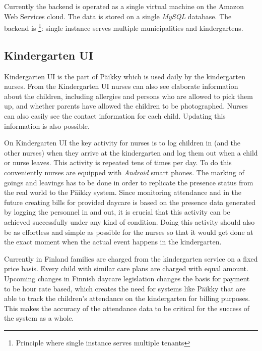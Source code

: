 Currently the backend is operated as a single virtual machine on the Amazon Web Services cloud. The data is stored on a single \textit{MySQL} database. The backend is \footnote{Principle where single instance serves multiple tenants}: single instance serves multiple municipalities and kindergartens. 






\subsection{Kindergarten UI}

Kindergarten UI is the part of Päikky which is used daily by the kindergarten nurses. From the Kindergarten UI nurses can also see elaborate information about the children, including allergies and persons who are allowed to pick them up, and whether parents have allowed the children to be photographed. Nurses can also easily see the contact information for each child. Updating this information is also possible. %

On Kindergarten UI the key activity for nurses is to log children in (and the other nurses) when they arrive at the kindergarten and log them out when a child or nurse leaves. This activity is repeated tens of times per day. To do this conveniently nurses are equipped with \textit{Android} smart phones. The marking of goings and leavings has to be done in order to replicate the presence status from the real world to the Päikky system. Since monitoring attendance and in the future creating bills for provided daycare is based on the presence data generated by logging the personnel in and out, it is crucial that this activity can be achieved successfully under any kind of condition. Doing this activity should also be as effortless and simple as possible for the nurses so that it would get done at the exact moment when the actual event happens in the kindergarten. 

Currently in Finland families are charged from the kindergarten service on a fixed price basis. Every child with similar care plans are charged with equal amount. Upcoming changes in Finnish daycare legislation changes the basis for payment to be hour rate based, which creates the need for systems like Päikky that are able to track the children's attendance on the kindergarten for billing purposes. This makes the accuracy of the attendance data to be critical for the success of the system as a whole. %

